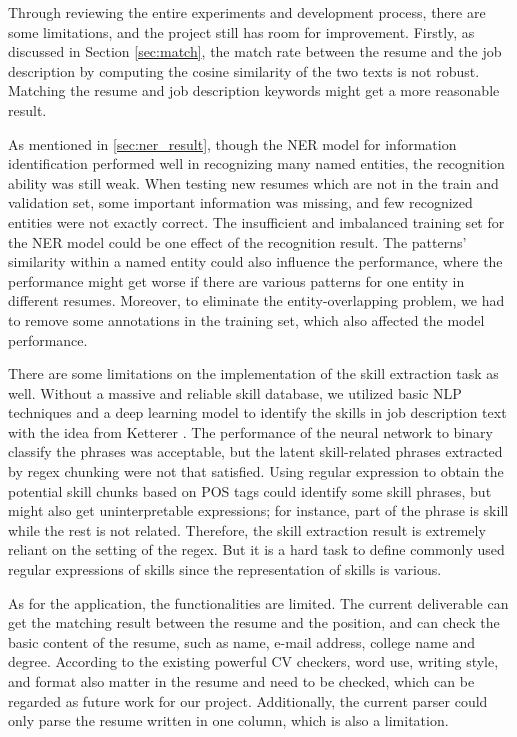 Through reviewing the entire experiments and development process, there are some limitations, and the project still has room for improvement. Firstly, as discussed in Section \ref{sec:match}, the match rate between the resume and the job description by computing the cosine similarity of the two texts is not robust. Matching the resume and job description keywords might get a more reasonable result. 

As mentioned in \ref{sec:ner_result}, though the NER model for information identification performed well in recognizing many named entities, the recognition ability was still weak. When testing new resumes which are not in the train and validation set, some important information was missing, and few recognized entities were not exactly correct. The insufficient and imbalanced training set for the NER model could be one effect of the recognition result. The patterns' similarity within a named entity could also influence the performance, where the performance might get worse if there are various patterns for one entity in different resumes. Moreover, to eliminate the entity-overlapping problem, we had to remove some annotations in the training set, which also affected the model performance.

There are some limitations on the implementation of the skill extraction task as well. Without a massive and reliable skill database, we utilized basic NLP techniques and a deep learning model to identify the skills in job description text with the idea from Ketterer \cite{ketterer}. The performance of the neural network to binary classify the phrases was acceptable, but the latent skill-related phrases extracted by regex chunking were not that satisfied. Using regular expression to obtain the potential skill chunks based on POS tags could identify some skill phrases, but might also get uninterpretable expressions; for instance, part of the phrase is skill while the rest is not related. Therefore, the skill extraction result is extremely reliant on the setting of the regex. But it is a hard task to define commonly used regular expressions of skills since the representation of skills is various. 

As for the application, the functionalities are limited. The current deliverable can get the matching result between the resume and the position, and can check the basic content of the resume, such as name, e-mail address, college name and degree. According to the existing powerful CV checkers, word use, writing style, and format also matter in the resume and need to be checked, which can be regarded as future work for our project. Additionally, the current parser could only parse the resume written in one column, which is also a limitation.

